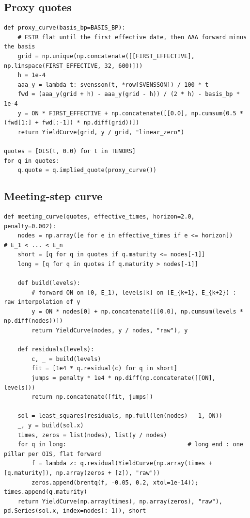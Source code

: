 \documentclass[11pt,a4paper]{article}
\theoremstyle{plain}
\theoremstyle{definition}
\begin{document}
\subsection{Proxy quotes}
\begin{lstlisting}[style=pystyle]
def proxy_curve(basis_bp=BASIS_BP):
    # ESTR flat until the first effective date, then AAA forward minus the basis
    grid = np.unique(np.concatenate([[FIRST_EFFECTIVE], np.linspace(FIRST_EFFECTIVE, 32, 600)]))
    h = 1e-4
    aaa_y = lambda t: svensson(t, *row[SVENSSON]) / 100 * t
    fwd = (aaa_y(grid + h) - aaa_y(grid - h)) / (2 * h) - basis_bp * 1e-4
    y = ON * FIRST_EFFECTIVE + np.concatenate([[0.0], np.cumsum(0.5 * (fwd[1:] + fwd[:-1]) * np.diff(grid))])
    return YieldCurve(grid, y / grid, "linear_zero")

quotes = [OIS(t, 0.0) for t in TENORS]
for q in quotes:
    q.quote = q.implied_quote(proxy_curve())
\end{lstlisting}

\subsection{Meeting-step curve}
\begin{lstlisting}[style=pystyle]
def meeting_curve(quotes, effective_times, horizon=2.0, penalty=0.002):
    nodes = np.array([e for e in effective_times if e <= horizon])        # E_1 < ... < E_n
    short = [q for q in quotes if q.maturity <= nodes[-1]]
    long = [q for q in quotes if q.maturity > nodes[-1]]

    def build(levels):
        # forward ON on [0, E_1), levels[k] on [E_{k+1}, E_{k+2}) : raw interpolation of y
        y = ON * nodes[0] + np.concatenate([[0.0], np.cumsum(levels * np.diff(nodes))])
        return YieldCurve(nodes, y / nodes, "raw"), y

    def residuals(levels):
        c, _ = build(levels)
        fit = [1e4 * q.residual(c) for q in short]
        jumps = penalty * 1e4 * np.diff(np.concatenate([[ON], levels]))
        return np.concatenate([fit, jumps])

    sol = least_squares(residuals, np.full(len(nodes) - 1, ON))
    _, y = build(sol.x)
    times, zeros = list(nodes), list(y / nodes)
    for q in long:                                   # long end : one pillar per OIS, flat forward
        f = lambda z: q.residual(YieldCurve(np.array(times + [q.maturity]), np.array(zeros + [z]), "raw"))
        zeros.append(brentq(f, -0.05, 0.2, xtol=1e-14)); times.append(q.maturity)
    return YieldCurve(np.array(times), np.array(zeros), "raw"), pd.Series(sol.x, index=nodes[:-1]), short
\end{lstlisting}
\end{document}
